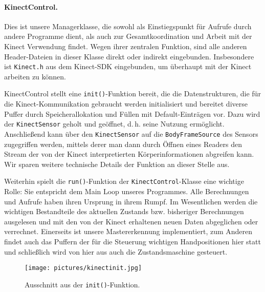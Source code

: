 	\paragraph{KinectControl.} Dies ist unsere Managerklasse, die sowohl als Einstiegspunkt für Aufrufe durch andere Programme dient, als auch zur Gesamtkoordination und Arbeit mit der Kinect Verwendung findet. Wegen ihrer zentralen Funktion, sind alle anderen Header-Dateien in dieser Klasse direkt oder indirekt eingebunden. Insbesondere ist \texttt{Kinect.h} aus dem Kinect-SDK eingebunden, um überhaupt mit der Kinect arbeiten zu können.\par 
	KinectControl stellt eine \texttt{init()}-Funktion bereit, die die Datenstrukturen, die für die Kinect-Kommunikation gebraucht werden initialisiert und bereitet diverse Puffer durch Speicherallokation und Füllen mit Default-Einträgen vor. Dazu wird der \texttt{KinectSensor} geholt und \glqq geöffnet\grqq{}, d.\,h. seine Nutzung ermöglicht. Anschließend kann über den \texttt{KinectSensor} auf die \texttt{BodyFrameSource} des Sensors zugegriffen werden, mittels derer man dann durch Öffnen eines Readers den Stream der von der Kinect interpretierten Körperinformationen abgreifen kann. Wir sparen weitere technische Details der Funktion an dieser Stelle aus.\par\smallskip
	Weiterhin spielt die \texttt{run()}-Funktion der \texttt{KinectControl}-Klasse eine wichtige Rolle: Sie entspricht dem \glqq Main Loop\grqq{} unseres Programmes. Alle Berechnungen und Aufrufe haben ihren Ursprung in ihrem Rumpf. Im Wesentlichen werden die wichtigen Bestandteile des aktuellen Zustands bzw. bisheriger Berechnungen ausgelesen und mit den von der Kinect erhaltenen neuen Daten abgeglichen oder verrechnet. Einerseits ist unsere Mastererkennung implementiert, zum Anderen findet auch das Puffern der für die Steuerung wichtigen Handpositionen hier statt und schließlich wird von hier aus auch die Zustandsmaschine gesteuert.\par
	\begin{figure}[h]
	\centering
	\texttt{[image: pictures/kinectinit.jpg]}
	\caption{Ausschnitt aus der \texttt{init()}-Funktion.}
	\end{figure}
	\par\medskip
